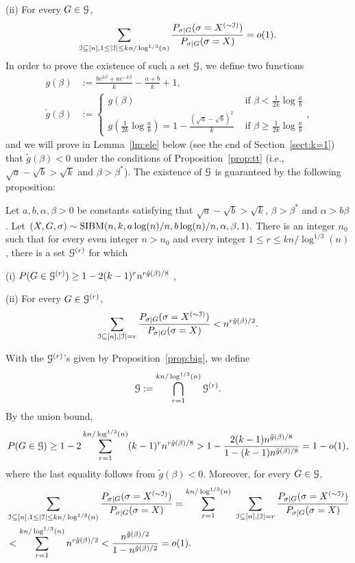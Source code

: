 \documentclass{article}
\begin{document}
\noindent (ii)
For every $G\in\mathcal{G}$,
$$
\sum_{\mathcal{I}\subseteq[n],1\le |\mathcal{I}|\le kn/\log^{1/3}(n)}
\frac{P_{\sigma|G}(\sigma=X^{(\sim\mathcal{I})})}{P_{\sigma|G}(\sigma=X)} =o(1) .
$$
In order to prove the existence of such a set $\mathcal{G}$, we define two functions
\begin{equation}  \label{eq:gbt}
\begin{aligned}
g(\beta) & := \frac{b e^{k\beta}+a e^{-k\beta}}{k}-\frac{a+b}{k}+1 , \\
\tilde{g}(\beta) & :=\left\{
\begin{array}{cc}
  g(\beta)   & \text{~if~} \beta< \frac{1}{2k}\log\frac{a}{b} \\
  g(\frac{1}{2k}\log\frac{a}{b})=1-\frac{(\sqrt{a}-\sqrt{b})^2}{k}  & \text{~if~} \beta\ge \frac{1}{2k}\log\frac{a}{b}
\end{array}
\right. ,
\end{aligned}
\end{equation}
and we will prove in Lemma~\ref{lm:ele} below (see the end of Section~\ref{sect:k=1}) that $\tilde{g}(\beta)<0$ under the conditions of Proposition~\ref{prop:tt} (i.e., $\sqrt{a}-\sqrt{b} > \sqrt{k}$ and $\beta>\beta^\ast$).
The existence of $\mathcal{G}$ is guaranteed by the following proposition:
\begin{proposition} \label{prop:big}
Let $a,b,\alpha,\beta> 0$ be constants satisfying that $\sqrt{a}-\sqrt{b} > \sqrt{k}$, $\beta>\beta^\ast$ and $\alpha>b\beta$. 
Let 
$
(X,G,\sigma) \sim \operatorname{SIBM}(n,k,a\log(n)/n, b\log(n)/n,\alpha,\beta, 1) .
$
There is an integer $n_0$ such that for every even integer $n>n_0$ and  every integer $1\le r\le kn/\log^{1/3}(n)$, there is a set $\mathcal{G}^{(r)}$ for which

\noindent (i)
$P(G\in\mathcal{G}^{(r)}) \ge 1- 2(k-1)^r n^{r\tilde{g}(\beta)/8}$ ,

\noindent (ii) For every $G\in\mathcal{G}^{(r)}$,
$$
\sum_{\mathcal{I}\subseteq[n],|\mathcal{I}|=r}
\frac{P_{\sigma|G}(\sigma=X^{(\sim \mathcal{I})} )}
{P_{\sigma|G}(\sigma=X)} <
n^{r \tilde{g}(\beta) /2} .
$$
\end{proposition}
With the $\mathcal{G}^{(r)}$'s given by Proposition~\ref{prop:big}, we
define 
$$
\mathcal{G}:=\bigcap_{r=1}^{kn/\log^{1/3}(n)} \mathcal{G}^{(r)} .
$$
By the union bound,
$$
P(G\in\mathcal{G})\ge 1-2 \sum_{r=1}^{kn/\log^{1/3}(n)} (k-1)^rn^{r\tilde{g}(\beta)/8}
> 1- \frac{2 (k-1)n^{\tilde{g}(\beta)/8}}{1-(k-1)n^{\tilde{g}(\beta)/8}}
=1-o(1),
$$
where the last equality follows from $\tilde{g}(\beta)<0$. Moreover, for every $G\in\mathcal{G}$,
\begin{align*}
& \sum_{\mathcal{I}\subseteq[n],1\le |\mathcal{I}|\le kn/\log^{1/3}(n)}
\frac{P_{\sigma|G}(\sigma=X^{(\sim\mathcal{I})})}{P_{\sigma|G}(\sigma=X)} =
\sum_{r=1}^{kn/\log^{1/3}(n)}
\hspace*{0.05in}
\sum_{\mathcal{I}\subseteq[n],|\mathcal{I}|=r}
\frac{P_{\sigma|G}(\sigma=X^{(\sim \mathcal{I})} )}
{P_{\sigma|G}(\sigma=X)}  \\
& < \sum_{r=1}^{kn/\log^{1/3}(n)}
n^{r \tilde{g}(\beta) /2}
< \frac{n^{\tilde{g}(\beta)/2}}{1-n^{\tilde{g}(\beta)/2}} =o(1) .
\end{align*}
\end{document}
